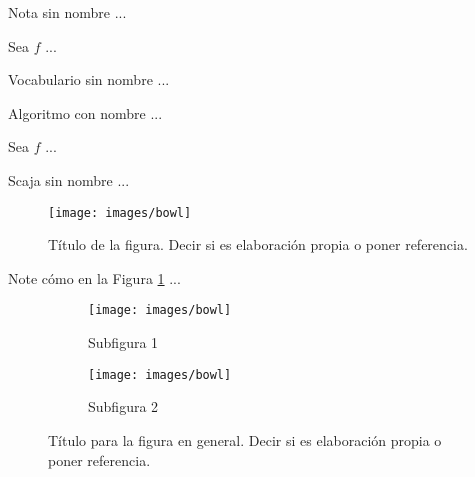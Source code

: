 \documentclass[fleqn]{Paquetes/RevDigMatEduInt}
\begin{document}
\begin{nota}
Nota sin nombre ...
\end{nota}

\begin{vocabulario}
Sea $f$ ...
\end{vocabulario}

\begin{vocabulario}
Vocabulario sin nombre ...
\end{vocabulario}

\begin{algoritmo}
	Algoritmo con nombre ...
\end{algoritmo}


\begin{caja}
Sea $f$ ...
\end{caja}

\begin{scaja}
Scaja sin nombre ...
\end{scaja}


\begin{figure}[ht!!!]
	\centering
	\begin{minipage}{0.7\textwidth}
		\centering
		\texttt{[image: images/bowl]}
		\caption{Título de la figura. Decir si es elaboración propia o poner referencia.}
		\label{fig:nombre}
	\end{minipage}
\end{figure}

Note cómo en la Figura \ref{fig:nombre} ...

\begin{figure}[ht!!!]
	\centering
	\begin{minipage}{0.7\textwidth}
		\centering
		\begin{subfigure}{0.47\textwidth}
			\centering
			\texttt{[image: images/bowl]}
			\caption{Subfigura 1}
			\label{subfig:1}
		\end{subfigure}
		\begin{subfigure}{0.47\textwidth}
			\centering
			\texttt{[image: images/bowl]}
			\caption{Subfigura 2}
			\label{subfig:2}
		\end{subfigure}
		\caption{ Título para la figura en general. Decir si es elaboración propia o poner referencia.}
		\label{fig:2}
	\end{minipage}
\end{figure}
\end{document}
